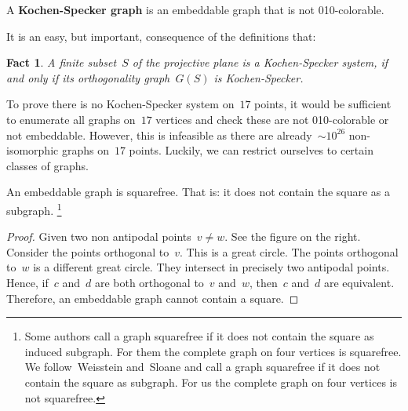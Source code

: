 \documentclass{report}
\newcommand{\keyword}[1]{\textbf{#1}}
\newtheorem{fact}{Fact}[section]
\begin{document}
\begin{definition}
A \keyword{Kochen-Specker graph}
is an embeddable graph that is not 010-colorable.
\end{definition}
It is an easy, but important, consequence of the definitions that:
\begin{fact}
    A finite subset~$S$ of the projective plane
    is a Kochen-Specker system,
    if and only if its orthogonality graph~$G(S)$
    is Kochen-Specker.
\end{fact}

To prove there is no Kochen-Specker system on~$17$ points,
it would be sufficient to enumerate all graphs on~$17$ vertices
and check these are not 010-colorable or not embeddable.
However, this is infeasible as there are
already~${\sim}10^{26}$ non-isomorphic
graphs on~$17$ points.\cite{oeisA000088}
Luckily, we can restrict ourselves to certain classes of graphs.
\begin{proposition}
    An embeddable graph is squarefree.
    That is: it does not contain the square as a subgraph.%
    \footnote{Some authors call a graph squarefree if it does not
        contain the square as induced subgraph.
        For them the complete graph on four vertices is squarefree.
        We follow~Weisstein\cite{sf-weisstein} and~Sloane\cite{sf-sloane} and
        call a graph squarefree if it does not
        contain the square as subgraph.
        For us the complete graph on four vertices is not squarefree.}
\end{proposition}


\begin{proof}
    Given two non antipodal points~$v\neq w$.
    See the figure on the right.
    Consider the points orthogonal to~$v$.
    This is a great circle.
    The points orthogonal to~$w$ is a different great circle.
    They intersect in precisely two antipodal points.
    Hence, if~$c$ and~$d$ are both orthogonal to~$v$ and~$w$,
    then~$c$ and~$d$ are equivalent.
    Therefore, an embeddable graph cannot contain a square.
\end{proof}
\end{document}

